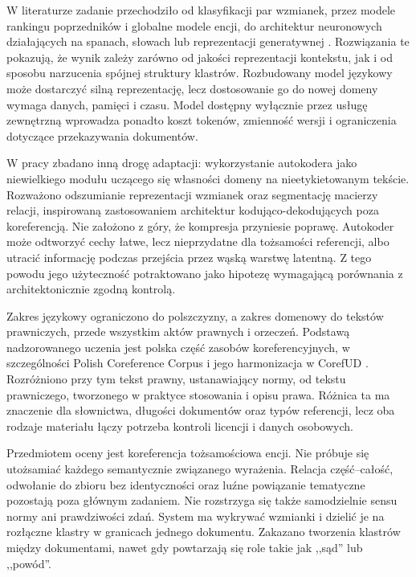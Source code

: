 W literaturze zadanie przechodziło od klasyfikacji par wzmianek, przez modele rankingu poprzedników i globalne modele encji, do architektur neuronowych działających na spanach, słowach lub reprezentacji generatywnej \cite{soon_2001_machine,wiseman_2016_global,lee_2017_e2e,dobrovolskii_2021_word,zhang_2023_seq2seq}. Rozwiązania te pokazują, że wynik zależy zarówno od jakości reprezentacji kontekstu, jak i od sposobu narzucenia spójnej struktury klastrów. Rozbudowany model językowy może dostarczyć silną reprezentację, lecz dostosowanie go do nowej domeny wymaga danych, pamięci i czasu. Model dostępny wyłącznie przez usługę zewnętrzną wprowadza ponadto koszt tokenów, zmienność wersji i ograniczenia dotyczące przekazywania dokumentów.

W pracy zbadano inną drogę adaptacji: wykorzystanie autokodera jako niewielkiego modułu uczącego się własności domeny na nieetykietowanym tekście. Rozważono odszumianie reprezentacji wzmianek oraz segmentację macierzy relacji, inspirowaną zastosowaniem architektur kodująco-dekodujących poza koreferencją. Nie założono z góry, że kompresja przyniesie poprawę. Autokoder może odtworzyć cechy łatwe, lecz nieprzydatne dla tożsamości referencji, albo utracić informację podczas przejścia przez wąską warstwę latentną. Z tego powodu jego użyteczność potraktowano jako hipotezę wymagającą porównania z architektonicznie zgodną kontrolą.

Zakres językowy ograniczono do polszczyzny, a zakres domenowy do tekstów prawniczych, przede wszystkim aktów prawnych i orzeczeń. Podstawą nadzorowanego uczenia jest polska część zasobów koreferencyjnych, w szczególności Polish Coreference Corpus i jego harmonizacja w CorefUD \cite{ogrodniczuk_2014_pcc,nedoluzhko_2022_corefud}. Rozróżniono przy tym tekst prawny, ustanawiający normy, od tekstu prawniczego, tworzonego w praktyce stosowania i opisu prawa. Różnica ta ma znaczenie dla słownictwa, długości dokumentów oraz typów referencji, lecz oba rodzaje materiału łączy potrzeba kontroli licencji i danych osobowych.

Przedmiotem oceny jest koreferencja tożsamościowa encji. Nie próbuje się utożsamiać każdego semantycznie związanego wyrażenia. Relacja część--całość, odwołanie do zbioru bez identyczności oraz luźne powiązanie tematyczne pozostają poza głównym zadaniem. Nie rozstrzyga się także samodzielnie sensu normy ani prawdziwości zdań. System ma wykrywać wzmianki i dzielić je na rozłączne klastry w granicach jednego dokumentu. Zakazano tworzenia klastrów między dokumentami, nawet gdy powtarzają się role takie jak ,,sąd'' lub ,,powód''.

